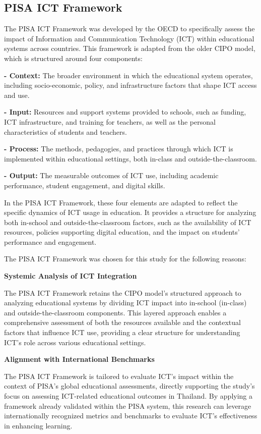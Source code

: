 \documentclass[
]{article}
\begin{document}
\hypertarget{pisa-ict-framework}{%
\subsection{PISA ICT Framework}\label{pisa-ict-framework}}

The PISA ICT Framework was developed by the OECD to specifically assess
the impact of Information and Communication Technology (ICT) within
educational systems across countries. This framework is adapted from the
older CIPO model, which is structured around four components:

\textbf{- Context:} The broader environment in which the educational
system operates, including socio-economic, policy, and infrastructure
factors that shape ICT access and use.

\textbf{- Input:} Resources and support systems provided to schools,
such as funding, ICT infrastructure, and training for teachers, as well
as the personal characteristics of students and teachers.

\textbf{- Process:} The methods, pedagogies, and practices through which
ICT is implemented within educational settings, both in-class and
outside-the-classroom.

\textbf{- Output:} The measurable outcomes of ICT use, including
academic performance, student engagement, and digital skills.

In the PISA ICT Framework, these four elements are adapted to reflect
the specific dynamics of ICT usage in education. It provides a structure
for analyzing both in-school and outside-the-classroom factors, such as
the availability of ICT resources, policies supporting digital
education, and the impact on students' performance and engagement.

The PISA ICT Framework was chosen for this study for the following
reasons:

\textbf{Systemic Analysis of ICT Integration}

The PISA ICT Framework retains the CIPO model's structured approach to
analyzing educational systems by dividing ICT impact into in-school
(in-class) and outside-the-classroom components. This layered approach
enables a comprehensive assessment of both the resources available and
the contextual factors that influence ICT use, providing a clear
structure for understanding ICT's role across various educational
settings.

\textbf{Alignment with International Benchmarks}

The PISA ICT Framework is tailored to evaluate ICT's impact within the
context of PISA's global educational assessments, directly supporting
the study's focus on assessing ICT-related educational outcomes in
Thailand. By applying a framework already validated within the PISA
system, this research can leverage internationally recognized metrics
and benchmarks to evaluate ICT's effectiveness in enhancing learning.
\end{document}
